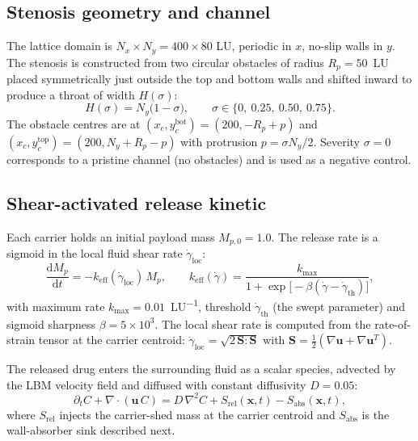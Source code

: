\documentclass[11pt,a4paper]{article}
\begin{document}
\subsection{Stenosis geometry and channel}
\label{sec:methods-geometry}

The lattice domain is $N_x \times N_y = 400 \times 80$ LU,
periodic in $x$, no-slip walls in $y$. The stenosis is constructed
from two circular obstacles of radius $R_p = 50$~LU placed
symmetrically just outside the top and bottom walls and shifted
inward to produce a throat of width $H(\sigma)$:
\begin{equation}
H(\sigma) = N_y \bigl( 1 - \sigma \bigr),
\qquad
\sigma \in \{0,\ 0.25,\ 0.50,\ 0.75\}.
\end{equation}
The obstacle centres are at
$(x_c, y_c^{\text{bot}}) = (200, -R_p + p)$ and
$(x_c, y_c^{\text{top}}) = (200, N_y + R_p - p)$ with protrusion
$p = \sigma N_y / 2$. Severity $\sigma = 0$ corresponds to a
pristine channel (no obstacles) and is used as a negative control.

\subsection{Shear-activated release kinetic}
\label{sec:methods-release}

Each carrier holds an initial payload mass $M_{p,0} = 1.0$. The
release rate is a sigmoid in the local fluid shear rate
$\dot\gamma_{\text{loc}}$:
\begin{equation}
\frac{\mathrm{d}M_p}{\mathrm{d}t} =
   -k_{\text{eff}}(\dot\gamma_{\text{loc}})\,M_p,
\qquad
k_{\text{eff}}(\dot\gamma) =
   \frac{k_{\max}}{1 + \exp\!\bigl[-\beta(\dot\gamma - \dot\gamma_{\text{th}})\bigr]},
\label{eq:shear-release}
\end{equation}
with maximum rate $k_{\max} = 0.01$~LU\textsuperscript{$-1$},
threshold $\dot\gamma_{\text{th}}$ (the swept parameter) and
sigmoid sharpness $\beta = 5\times 10^{3}$. The local shear rate
is computed from the rate-of-strain tensor at the carrier centroid:
$\dot\gamma_{\text{loc}} = \sqrt{2\,\mathbf{S}:\mathbf{S}}$ with
$\mathbf{S} = \tfrac{1}{2}(\nabla\boldsymbol u + \nabla\boldsymbol u^{T})$.

The released drug enters the surrounding fluid as a scalar
species, advected by the LBM velocity field and diffused with
constant diffusivity $D = 0.05$:
\begin{equation}
\partial_t C + \nabla\!\cdot\!(\boldsymbol u\, C) =
   D\,\nabla^2 C
   + S_{\text{rel}}(\boldsymbol x, t)
   - S_{\text{abs}}(\boldsymbol x, t),
\label{eq:adr}
\end{equation}
where $S_{\text{rel}}$ injects the carrier-shed mass at the
carrier centroid and $S_{\text{abs}}$ is the wall-absorber sink
described next.
\end{document}

